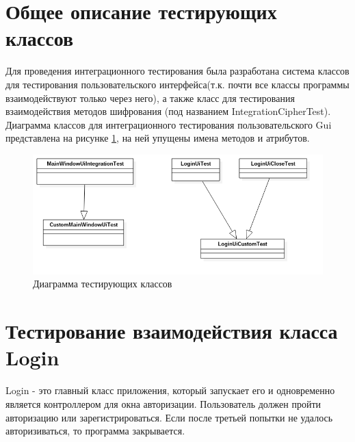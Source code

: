 \documentclass[a4paper,12pt]{article}
\begin{document}
\newpage\section{Общее описание тестирующих классов}
Для проведения интеграционного тестирования была разработана система классов для тестирования пользовательского интерфейса(т.к. почти все классы программы взаимодействуют только через него), а также класс для тестирования взаимодействия методов шифрования (под названием IntegrationCipherTest). Диаграмма классов для интеграционного тестирования пользовательского Gui представлена на рисунке \ref{fig:class_diagram_test_gui}, на ней упущены имена методов и атрибутов.
\begin{center}
	\begin{figure}[h!]
		\centering
   		\includegraphics[scale=0.6]{img/class_diagram_testing.png}
   		\caption{Диаграмма тестирующих классов}
   		\label{fig:class_diagram_test_gui}
    \end{figure}
\end{center}


\newpage\section{Тестирование взаимодействия класса Login}
Login - это главный класс приложения, который запускает его и одновременно является контроллером для окна авторизации. Пользователь должен пройти авторизацию или зарегистрироваться. Если после третьей попытки не удалось авторизиваться, то программа закрывается.
\end{document}
